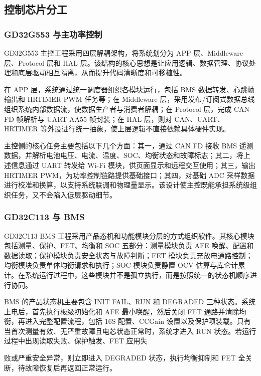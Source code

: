 \subsection{控制芯片分工}

\subsubsection{GD32G553 与主功率控制}

GD32G553 主控工程采用四层解耦架构，将系统划分为 APP 层、Middleware 层、Protocol 层和 HAL 层。该结构的核心思想是让应用逻辑、数据管理、协议处理和底层驱动相互隔离，从而提升代码清晰度和可移植性。

在 APP 层，系统通过统一调度器组织各模块运行，包括 BMS 数据转发、心跳帧输出和 HRTIMER PWM 任务等；在 Middleware 层，采用发布/订阅式数据总线组织系统内部数据流，使数据生产者与消费者解耦；在 Protocol 层，完成 CAN FD 帧解析与 UART AA55 帧封装；在 HAL 层，则对 CAN、UART、HRTIMER 等外设进行统一抽象，使上层逻辑不直接依赖具体硬件实现。

主控侧的核心任务主要包括以下几个方面：其一，通过 CAN FD 接收 BMS 遥测数据，并解析电池电压、电流、温度、SOC、均衡状态和故障标志；其二，将上述信息通过 UART 转发给 Wi-Fi 模块，供页面显示和远程交互使用；其三，输出 HRTIMER PWM，为功率控制链路提供基础接口；其四，对基础 ADC 采样数据进行校准和换算，以支持系统联调和物理量显示。该设计使主控既能承担系统级组织任务，又不会陷入低层驱动细节。

\subsubsection{GD32C113 与 BMS}

GD32C113 BMS 工程采用产品态机和功能模块分层的方式组织软件。其核心模块包括测量、保护、FET、均衡和 SOC 五部分：测量模块负责 AFE 唤醒、配置和数据读取；保护模块负责安全状态与故障判断；FET 模块负责充放电通路控制；均衡模块负责单体均衡请求和执行；SOC 模块负责静置 OCV 估算与库仑计累计。在系统运行过程中，这些模块并不是孤立执行，而是按照统一的状态机顺序进行协同。

BMS 的产品状态机主要包含 INIT FAIL、RUN 和 DEGRADED 三种状态。系统上电后，首先执行板级初始化和 AFE 最小唤醒，然后关闭 FET 通路并清除均衡，再进入完整配置流程，包括 16S 配置、CCGain 设置以及保护项装载。只有当首次测量有效、无严重故障且电芯状态正常时，系统才进入 RUN 状态。若运行过程中出现读取失败、保护触发、FET 应用失

败或严重安全异常，则立即进入 DEGRADED 状态，执行均衡抑制和 FET 全关断，待故障恢复后再返回正常运行。

